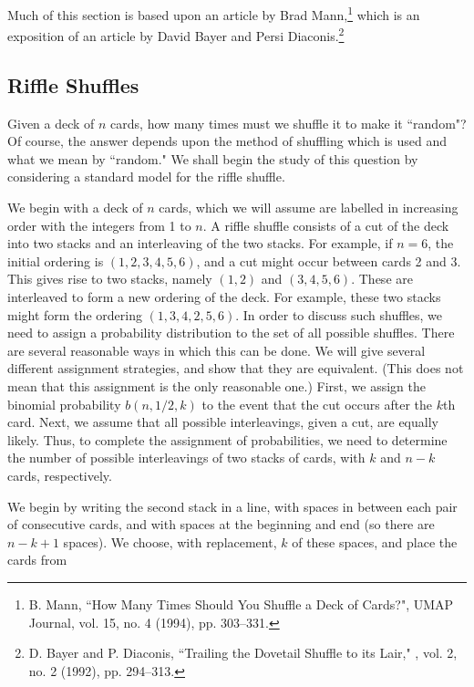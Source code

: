 Much of this section is based upon an article by Brad Mann,\footnote{B. Mann, ``How Many
Times Should You Shuffle a Deck of Cards?", \emx 
{UMAP Journal}, vol. 15, no. 4 (1994), pp. 303--331.}
which is an exposition of an  article by David Bayer and Persi Diaconis.\footnote{D. Bayer and
P. Diaconis, ``Trailing the Dovetail Shuffle to its Lair," ,
vol. 2, no. 2 (1992), pp. 294--313.}
\subsection*{Riffle Shuffles}
Given a deck of $n$ cards, how many times must we shuffle it to make it ``random"?  Of
course, the answer depends upon the method of shuffling which is used and what we mean
by ``random."  We shall begin the study of this question by considering a standard
model for the riffle shuffle.
\par We begin with a deck of $n$ cards, which we will assume are labelled in
increasing order  with the integers from 1 to $n$.  A riffle shuffle consists of a cut
of the deck into two stacks and an interleaving of the two
stacks.  For example, if $n = 6$, the initial ordering is
$(1, 2, 3, 4, 5, 6)$, and a cut might occur between cards 2 and 3.  This gives rise to
two stacks, namely $(1, 2)$ and $(3, 4, 5, 6)$.  These are interleaved to form a new
ordering of the deck.  For example, these two stacks might form the ordering $(1, 3,
4, 2, 5, 6)$.  In order to discuss such shuffles, we need to assign a probability
distribution to the set of all possible shuffles.  There are several reasonable ways in
which this can be done.  We will give several different assignment strategies, and
show that they are equivalent.  (This does not mean that this assignment is the only
reasonable one.)  First, we assign the binomial probability $b(n, 1/2, k)$ to the
event that the cut occurs after the $k$th card.  Next, we assume that all possible
interleavings, given a cut, are equally likely.  Thus, to complete the assignment of
probabilities, we need to determine the number of possible interleavings of two stacks
of cards, with $k$ and $n-k$ cards, respectively.
\par We begin by writing the second stack in a line, with spaces in between each pair
of consecutive cards, and with spaces at the beginning and end (so there are $n-k+1$
spaces). We choose, with replacement, $k$ of these spaces, and place the cards from
